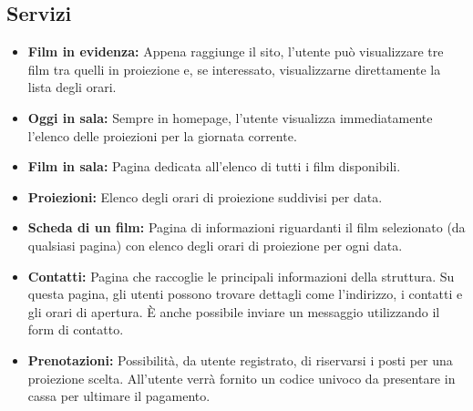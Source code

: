 \subsection{Servizi}
\begin{itemize}
    \item \textbf{Film in evidenza:} Appena raggiunge il sito, l'utente può visualizzare tre film tra quelli in proiezione e, se interessato, visualizzarne direttamente la lista degli orari.
    \item \textbf{Oggi in sala:} Sempre in homepage, l'utente visualizza immediatamente l'elenco delle proiezioni per la giornata corrente.
    \item \textbf{Film in sala:} Pagina dedicata all'elenco di tutti i film disponibili.
    \item \textbf{Proiezioni:} Elenco degli orari di proiezione suddivisi per data.
    \item \textbf{Scheda di un film:} Pagina di informazioni riguardanti il film selezionato (da qualsiasi pagina) con elenco degli orari di proiezione per ogni data.
    \item \textbf{Contatti:} Pagina che raccoglie le principali informazioni della struttura. Su questa pagina, gli utenti possono trovare dettagli come l'indirizzo, i contatti e gli orari di apertura.
    È anche possibile inviare un messaggio utilizzando il form di contatto.
    \item \textbf{Prenotazioni:} Possibilità, da utente registrato, di riservarsi i posti per una proiezione scelta. All'utente verrà fornito un codice univoco da presentare in cassa per ultimare il pagamento.
\end{itemize}
